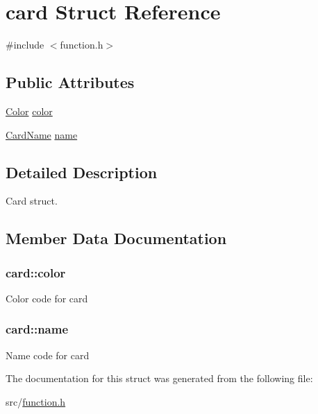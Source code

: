\hypertarget{structcard}{\section{card Struct Reference}
\label{structcard}
}


{\ttfamily \#include $<$function.\+h$>$}

\subsection*{Public Attributes}
\begin{DoxyCompactItemize}
\item 
\hyperlink{function_8h_ac68007736ff4dd6d39556282f88cfc70}{Color} \hyperlink{structcard_af92957c1c526f13997574ca6f3ff38ec}{color}
\item 
\hyperlink{function_8h_a11ef94b5767a7e6e40fde829c3dc8d40}{Card\+Name} \hyperlink{structcard_a48c7904b1faf55298cf79b5bd6899839}{name}
\end{DoxyCompactItemize}


\subsection{Detailed Description}
Card struct. 

\subsection{Member Data Documentation}
\hypertarget{structcard_af92957c1c526f13997574ca6f3ff38ec}{
\subsubsection[{color}]{ card\+::color}}\label{structcard_af92957c1c526f13997574ca6f3ff38ec}
Color code for card \hypertarget{structcard_a48c7904b1faf55298cf79b5bd6899839}{
\subsubsection[{name}]{ card\+::name}}\label{structcard_a48c7904b1faf55298cf79b5bd6899839}
Name code for card 

The documentation for this struct was generated from the following file\+:\begin{DoxyCompactItemize}
\item 
src/\hyperlink{function_8h}{function.\+h}\end{DoxyCompactItemize}

